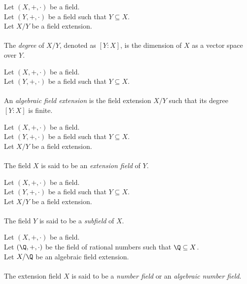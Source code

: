 \begin{definition-pre}
    \label{def:degree_field_extension}
    Let $(X, +, \cdot)$ be a field. \\
    Let $(Y, +, \cdot)$ be a field such that $Y \subseteq X$. \\
    Let $X/Y$ be a field extension. \\\\
    The \textit{degree} of $X/Y$, denoted as $[Y:X]$, is the dimension of $X$ as a vector space over $Y$.
\end{definition-pre}

\begin{definition-pre}
    \label{def:algebraic_field_extension}
    Let $(X, +, \cdot)$ be a field. \\
    Let $(Y, +, \cdot)$ be a field such that $Y \subseteq X$. \\\\
    An \textit{algebraic field extension} is the field extension $X/Y$ such that its degree $[Y:X]$
    is finite.
\end{definition-pre}

\begin{definition-pre}
    \label{def:extension_field}
    Let $(X, +, \cdot)$ be a field. \\
    Let $(Y, +, \cdot)$ be a field such that $Y \subseteq X$. \\
    Let $X/Y$ be a field extension. \\\\
    The field $X$ is said to be an \textit{extension field} of $Y$.
\end{definition-pre}

\begin{definition-pre}[Subfield]
    \label{def:subfield}
    Let $(X, +, \cdot)$ be a field. \\
    Let $(Y, +, \cdot)$ be a field such that $Y \subseteq X$. \\
    Let $X/Y$ be a field extension. \\\\
    The field $Y$ is said to be a \textit{subfield} of $X$.
\end{definition-pre}

\begin{definition-pre}
    \label{def:number_field}
    Let $(X, +, \cdot)$ be a field. \\
    Let $(\Q, +, \cdot)$ be the field of rational numbers such that $\Q \subseteq X$. \\
    Let $X/\Q$ be an algebraic field extension. \\\\
    The extension field $X$ is said to be a \textit{number field} or an \textit{algebraic number field}.
\end{definition-pre}


